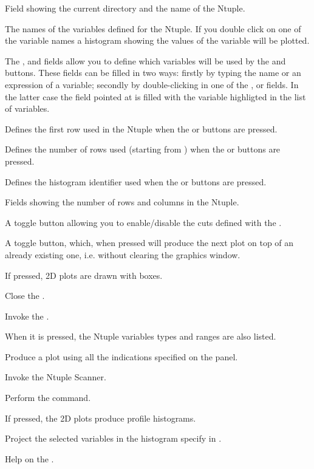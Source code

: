 \begin{EnumZW}\small
\item Field showing the current directory and the name of the Ntuple.
\item The names of the variables defined for the Ntuple.
      If you double click on one of the variable names
      a histogram showing the values of the variable will be plotted.
\item The ,  and  fields allow
      you to define which variables will be used
      by the  and  buttons.
      These fields can be filled in two ways:
      firstly by typing the name or an expression of a variable;
      secondly by double-clicking in one of the ,  or
       fields. In the latter
      case the field pointed at is filled with the variable highligted in
      the list of variables.
\item Defines the first row used in the Ntuple when the 
      or  buttons are pressed.
\item Defines the number of rows used (starting from ) when the
       or  buttons are pressed.
\item Defines the histogram identifier used when the 
      or  buttons are pressed.
\item Fields showing the number of rows and columns in the Ntuple.
\item A toggle button allowing you to enable/disable the cuts defined with the
      \CE{}.
\item A toggle button, which, when pressed will produce the next plot on top of
      an already existing one, i.e. without clearing the graphics window.
\item If pressed, 2D plots are drawn with boxes.
\end{EnumZW}

\begin{EnumZB}\small
\item Close the \NV.
\item Invoke the \CE{}.
\item When it is pressed, the Ntuple variables types and ranges are also listed.
\item Produce a plot using all the indications specified on the \NV{} panel.
\item Invoke the Ntuple Scanner.
\item Perform the  command. 
\item If pressed, the 2D plots produce profile histograms.
\item Project the selected variables in the histogram specify in .
\item Help on the \NV.
\end{EnumZB}

